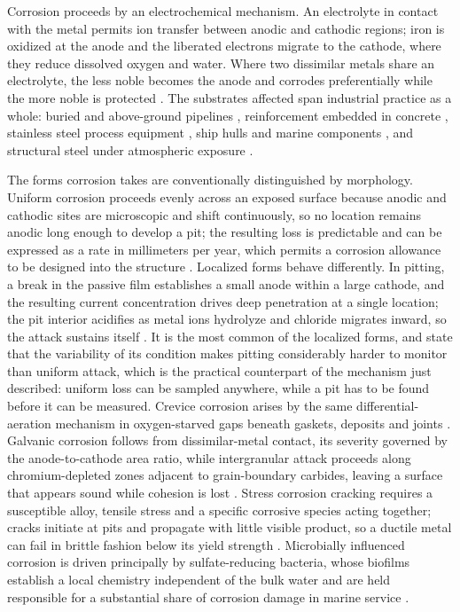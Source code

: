 Corrosion proceeds by an electrochemical mechanism. An electrolyte in contact
with the metal permits ion transfer between anodic and cathodic regions; iron is
oxidized at the anode and the liberated electrons migrate to the cathode, where
they reduce dissolved oxygen and water. Where two dissimilar metals share an
electrolyte, the less noble becomes the anode and corrodes preferentially while
the more noble is protected \citep{Qin2026,Wojciechowski2025}. The substrates affected span
industrial practice as a whole: buried and above-ground pipelines
\citep{Akhlaghi2023,Alvani2026}, reinforcement embedded in concrete \citep{Yang2025}, stainless steel process equipment
\citep{Li2022,Wojciechowski2025}, ship hulls and marine components \citep{Wang2021,Arias2025}, and
structural steel under atmospheric exposure \citep{DeKerf2022}.

The forms corrosion takes are conventionally distinguished by morphology.
Uniform corrosion proceeds evenly across an exposed surface because anodic and
cathodic sites are microscopic and shift continuously, so no location remains
anodic long enough to develop a pit; the resulting loss is predictable and can
be expressed as a rate in millimeters per year, which permits a corrosion
allowance to be designed into the structure \citep{Yang2026a,Arias2025}. Localized forms
behave differently. In pitting, a break in the passive film establishes a small
anode within a large cathode, and the resulting current concentration drives
deep penetration at a single location; the pit interior acidifies as metal ions
hydrolyze and chloride migrates inward, so the attack sustains itself
\citep{Nguyen2026,Liu2026,Li2022}. It is the most common of the localized forms,
and \citet{Huang2026a} state that the variability of its condition makes pitting
considerably harder to monitor than uniform attack, which is the practical
counterpart of the mechanism just described: uniform loss can be sampled
anywhere, while a pit has to be found before it can be measured. Crevice corrosion arises by the same differential-aeration
mechanism in oxygen-starved gaps beneath gaskets, deposits and joints \citep{Nguyen2026}.
Galvanic corrosion follows from dissimilar-metal contact, its severity governed
by the anode-to-cathode area ratio, while intergranular attack proceeds along
chromium-depleted zones adjacent to grain-boundary carbides, leaving a surface
that appears sound while cohesion is lost \citep{Qin2026,Wojciechowski2025}. Stress corrosion cracking
requires a susceptible alloy, tensile stress and a specific corrosive species
acting together; cracks initiate at pits and propagate with little visible
product, so a ductile metal can fail in brittle fashion below its yield strength
\citep{Liu2026,Akhlaghi2023}. Microbially influenced corrosion is driven principally by
sulfate-reducing bacteria, whose biofilms establish a local chemistry
independent of the bulk water and are held responsible for a substantial share
of corrosion damage in marine service \citep{Liang2021}.

